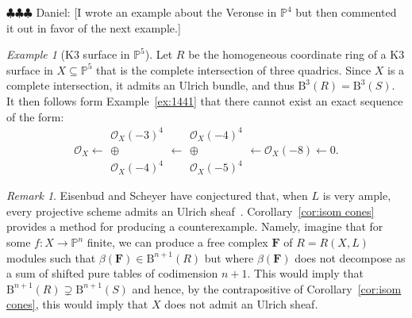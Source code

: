 \documentclass[12pt]{amsart}
\theoremstyle{definition}
\theoremstyle{remark}
\newtheorem{example}[lemma]{Example}
\newtheorem{remark}[lemma]{Remark}
\newcommand{\kk}{\Bbbk}
\newcommand{\PP}{\mathbb{P}}
\newcommand{\cO}{\mathcal{O}}
\newcommand{\FF}{\mathbf{F}}
\newcommand{\BBQ}{\mathrm{B}}
\newcommand{\daniel}[1]{{\color{green} \sf $\clubsuit\clubsuit\clubsuit$ Daniel: [#1]}}
\newcommand{\david}[1]{{\color{red} \sf $\clubsuit\clubsuit\clubsuit$ David: [#1]}}
\begin{document}
\daniel{I wrote an example about the Veronse in $\PP^4$ but then commented it out in favor of the next example.}
\begin{example}[K3 surface in $\PP^5$]
Let $R$ be the homogeneous coordinate ring of a K3 surface in $X\subseteq \PP^5$ that is the complete intersection of three quadrics. 
Since $X$ is a complete intersection, it admits an Ulrich bundle, and thus $\BBQ^3(R)=\BBQ^3(S)$.  It then follows form Example~\ref{ex:1441} that there cannot exist an exact sequence of the form:
\[
\cO_X\longleftarrow \begin{matrix}  \cO_X(-3)^4\\ \oplus\\ \cO_X(-4)^4\end{matrix}\longleftarrow \begin{matrix} \cO_X(-4)^4\\ \oplus\\ \cO_X(-5)^4\end{matrix} \longleftarrow \cO_X(-8)\longleftarrow 0.
\]
\end{example}

%


\begin{remark}
Eisenbud and Scheyer have conjectured that, when $L$ is very ample, every projective scheme admits an Ulrich sheaf~\cite[p. 543]{eis-schrey-chow}.  Corollary~\ref{cor:isom cones} provides a method for producing a counterexample.  Namely, imagine that for some $f\colon X\to \PP^n$ finite, we can produce a free complex $\FF$ of $R=R(X,L)$ modules such that $\beta(\FF)\in \BBQ^{n+1}(R)$ but where $\beta(\FF)$ does not decompose as a sum of shifted pure tables of codimension $n+1$.  This would imply that $\BBQ^{n+1}(R)\supsetneq \BBQ^{n+1}(S)$ and hence, by the contrapositive of Corollary~\ref{cor:isom cones}, this would imply that $X$ does not admit an Ulrich sheaf.
\end{remark}
\end{document}
